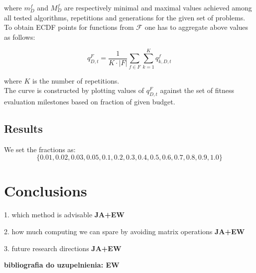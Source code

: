 \documentclass[runningheads,a4paper]{llncs}
\begin{document}
where $m^{f}_{D}$ and $M^{f}_{D}$ are respectively minimal and maximal values achieved among all tested algorithms, repetitions and generations for the given set of problems. \\

To obtain ECDF points for functions from $\mathcal{F}$ one has to aggregate above values as follows:

\begin{equation}
  q^{F}_{D, t} = \frac{1}{K \cdot |F|}\sum_{f \in F} \sum^{K}_{k = 1} q^{f}_{k, D, t}  
\end{equation}

where $K$ is the number of repetitions.\\
The curve is constructed by plotting values of $q^{F}_{D, t}$ against the set of fitness evaluation milestones based on fraction of given budget. 

\subsection{Results}

We set the fractions as:
\begin{equation*}
  \{0.01, 0.02, 0.03, 0.05, 0.1, 0.2, 0.3, 0.4, 0.5, 0.6, 0.7, 0.8, 0.9, 1.0\}
\end{equation*}

\section{Conclusions}

1. which method is advisable
{\bf  JA+EW}

2. how much computing we can spare by avoiding matrix operations
{\bf  JA+EW}

3. future research directions
{\bf  JA+EW}

{\bf bibliografia do uzupelnienia: EW}



\end{document}
